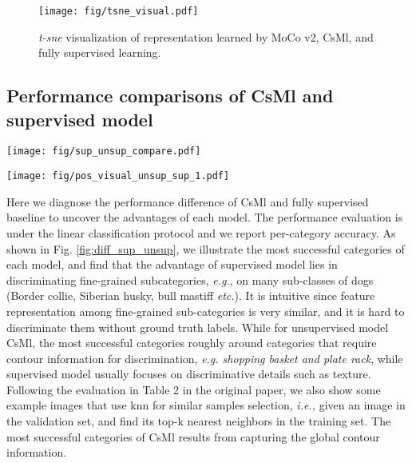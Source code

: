 \documentclass[10pt,twocolumn,letterpaper]{article}
\begin{document}
\begin{figure}[t!]
  \begin{center}
        \texttt{[image: fig/tsne\_visual.pdf]}
  \end{center}
  \vspace{-0.3cm}
     \caption{\textit{t-sne} visualization of representation learned by MoCo v2, CsMl, and fully supervised learning.}
  \label{t-sne}
\end{figure}






\subsection{Performance comparisons of CsMl and supervised model}





\begin{figure*}
    \centering
    
    \texttt{[image: fig/sup\_unsup\_compare.pdf]}
    \caption{Top-1 accuracy comparisons on different categories of CsMl and fully supervised model. Here we compare most successful categories of each method.}
    \label{fig:diff_sup_unsup}
\end{figure*}


\begin{figure*}
    \centering
    
    \texttt{[image: fig/pos\_visual\_unsup\_sup\_1.pdf]}
    \caption{An illustration of the selected knn samples using CsMl and the supervised model.}
    \label{fig:diff_sup_unsup}
\end{figure*}

Here we diagnose the performance difference of CsMl and fully supervised baseline to uncover the advantages of each model. The performance evaluation is under the linear classification protocol and we report per-category accuracy. As shown in Fig. \ref{fig:diff_sup_unsup}, we illustrate the most successful categories of each model, and find that the advantage of supervised model lies in discriminating fine-grained subcategories, \emph{e.g.}, on many sub-classes of dogs (Border collie, Siberian husky, bull mastiff \emph{etc.}). It is intuitive since feature representation among fine-grained sub-categories is very similar, and it is hard to discriminate them without ground truth labels. While for unsupervised model CsMl, the most successful categories roughly around categories that require contour information for discrimination, \emph{e.g. shopping basket and plate rack}, while supervised model usually focuses on discriminative details such as texture. Following the evaluation in Table 2 in the original paper, we also show some example images that use knn for similar samples selection, \emph{i.e.,} given an image in the validation set, and find its top-k nearest neighbors in the training set. The most successful categories of CsMl results from capturing the global contour information.

%
 
\end{document}
